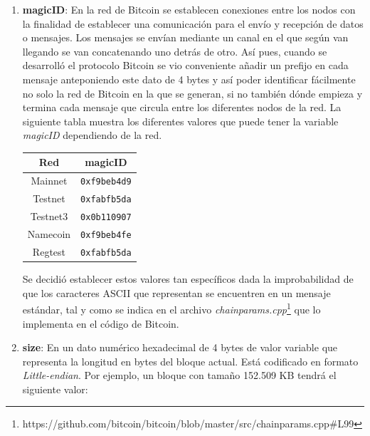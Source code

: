 \documentclass{article}
\begin{document}
    \begin{enumerate}
        \item \textbf{magicID}: En la red de Bitcoin se establecen conexiones entre los nodos con la finalidad de establecer una comunicación para el envío y recepción de datos o mensajes. Los mensajes se envían mediante un canal en el que según van llegando se van concatenando uno detrás de otro. Así pues, cuando se desarrolló el protocolo Bitcoin se vio conveniente añadir un prefijo en cada mensaje anteponiendo este dato de 4 bytes y así poder identificar fácilmente no solo la red de Bitcoin en la que se generan, si no también dónde empieza y termina cada mensaje que circula entre los diferentes nodos de la red. La siguiente tabla muestra los diferentes valores que puede tener la variable \textit{magicID} dependiendo de la red.
        
        \begin{table}[H]
        \centering
        \begin{tabular}{| c | c |} 
            \hline
            Red & magicID \\
            \hline
            Mainnet & \texttt{0xf9beb4d9} \\
            \hline
            Testnet & \texttt{0xfabfb5da} \\
            \hline
            Testnet3 & \texttt{0x0b110907} \\
            \hline
            Namecoin & \texttt{0xf9beb4fe} \\
            \hline
            Regtest & \texttt{0xfabfb5da} \\
            \hline
        \end{tabular}
        \label{table:1}
        \end{table}
        
        Se decidió establecer estos valores tan específicos dada la improbabilidad de que los caracteres ASCII que representan se encuentren en un mensaje estándar, tal y como se indica en el archivo \textit{chainparams.cpp}\footnote{https://github.com/bitcoin/bitcoin/blob/master/src/chainparams.cpp\#L99} que lo implementa en el código de Bitcoin.
    
        \item \textbf{size}: En un dato numérico hexadecimal de 4 bytes de valor variable que representa la longitud en bytes del bloque actual. Está codificado en formato \textit{Little-endian}. Por ejemplo, un bloque con tamaño 152.509 KB tendrá el siguiente valor:
        

\end{enumerate}
\end{document}
